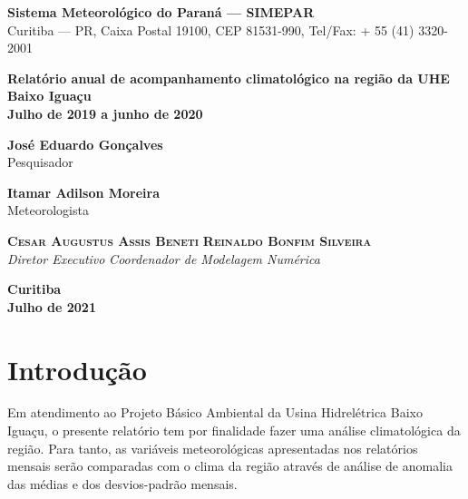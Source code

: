 \documentclass[a4paper,12pt]{article}
\begin{document}
\thispagestyle{empty}

\begin{flushleft}
\textbf{Sistema Meteorológico do Paraná --- SIMEPAR} \\
Curitiba --- PR, Caixa Postal 19100, CEP 81531-990, Tel/Fax: + 55 (41) 3320-2001
\end{flushleft}

\vspace{5.0cm}

\begin{center}
\fontsize{24pt}{28pt}\selectfont
\textbf{Relatório anual de acompanhamento climatológico na região da UHE Baixo Iguaçu}\\
\vspace{18pt}
\textbf{Julho de 2019 a junho de 2020
}\end{center}

\vspace{4.0cm}

\begin{center}
\textbf{José Eduardo Gonçalves}\\
Pesquisador\\

\vspace{12pt}

\textbf{Itamar Adilson Moreira}\\
Meteorologista\\
\end{center}

\vspace{12pt}

{\raggedleft \textbf{\textsc{Cesar Augustus Assis Beneti}}} \hfill \textsc{\textbf{Reinaldo Bonfim Silveira}}\\
\textit{Diretor Executivo} \hfill \textit{Coordenador de Modelagem Numérica}

\vspace{60pt}

\begin{center}
\textbf{Curitiba} \\
\textbf{Julho de 2021}
\end{center}

\newpage
\section{Introdução}

\hspace{0.5cm}Em atendimento ao Projeto Básico Ambiental da Usina Hidrelétrica Baixo Iguaçu,
o presente relatório tem por finalidade fazer uma análise climatológica da região. Para tanto, as
variáveis meteorológicas apresentadas nos relatórios mensais serão comparadas com o clima da região através de
análise de anomalia das médias e dos desvios-padrão mensais.
\end{document}
